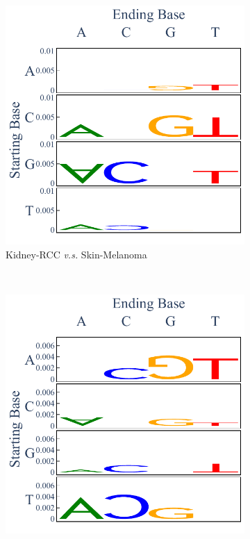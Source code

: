 \begin{figure}[ht!]
    \begin{subfigure}{.5\textwidth}
\includegraphics[scale=0.7]{graphics/spectra_Kidney-RCC_Skin-Melanoma.pdf}
    \caption{Kidney-RCC \textit{v.s.} Skin-Melanoma}
    \label{fig:spectra_kidney_skin}
    \end{subfigure}
    ~
    \begin{subfigure}{.5\textwidth}
    \includegraphics[scale=0.7]{graphics/spectra_Kidney-RCC_Liver-HCC.pdf}

\end{subfigure}
\end{figure}
